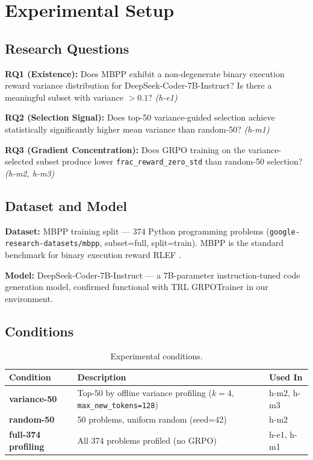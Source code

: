 \section{Experimental Setup}
\label{sec:experiments}

\subsection{Research Questions}

\textbf{RQ1 (Existence):} Does MBPP exhibit a non-degenerate binary execution reward variance distribution for DeepSeek-Coder-7B-Instruct? Is there a meaningful subset with variance $> 0.1$? \textit{(h-e1)}

\textbf{RQ2 (Selection Signal):} Does top-50 variance-guided selection achieve statistically significantly higher mean variance than random-50? \textit{(h-m1)}

\textbf{RQ3 (Gradient Concentration):} Does GRPO training on the variance-selected subset produce lower \texttt{frac\_reward\_zero\_std} than random-50 selection? \textit{(h-m2, h-m3)}

\subsection{Dataset and Model}

\textbf{Dataset:} MBPP training split \citep{Austin2021MBPP} --- 374 Python programming problems (\texttt{google-research-datasets/mbpp}, subset=full, split=train). MBPP is the standard benchmark for binary execution reward RLEF \citep{Gehring2024RLEF}.

\textbf{Model:} DeepSeek-Coder-7B-Instruct \citep{Guo2024DeepSeekCoder} --- a 7B-parameter instruction-tuned code generation model, confirmed functional with TRL GRPOTrainer in our environment.

\subsection{Conditions}

\begin{table}[h]
\centering
\caption{Experimental conditions.}
\label{tab:conditions}
\begin{tabular}{lll}
\toprule
Condition & Description & Used In \\
\midrule
\textbf{variance-50} & Top-50 by offline variance profiling ($k=4$, \texttt{max\_new\_tokens=128}) & h-m2, h-m3 \\
\textbf{random-50} & 50 problems, uniform random (seed=42) & h-m2 \\
\textbf{full-374 profiling} & All 374 problems profiled (no GRPO) & h-e1, h-m1 \\
\bottomrule
\end{tabular}
\end{table}

